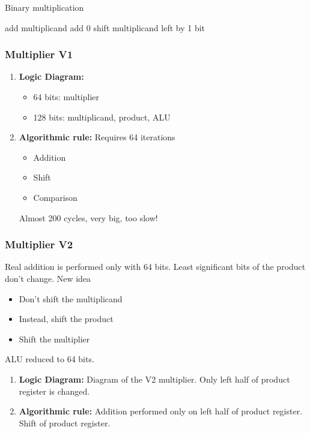 \begin{algorithm}[H]
    \caption{Binary multiplication}
    \begin{algorithmic}
            \State add multiplicand
        \Else
            \State add 0
        \EndIf
        \State shift multiplicand left by 1 bit
    \end{algorithmic}
\end{algorithm}

\subsubsection{Multiplier V1}
\begin{enumerate}
    \item \textbf{Logic Diagram:}
    \begin{itemize}
        \item 64 bits: multiplier
        \item 128 bits: multiplicand, product, ALU
    \end{itemize}
    \item \textbf{Algorithmic rule:} Requires 64 iterations
    \begin{itemize}
        \item Addition
        \item Shift
        \item Comparison
    \end{itemize}
    Almost 200 cycles, very big, too slow!
\end{enumerate}

\subsubsection{Multiplier V2}
Real addition is performed only with 64 bits. Least significant bits of the product don't change. New idea
\begin{itemize}
    \item Don’t shift the multiplicand
    \item Instead, shift the product
    \item Shift the multiplier
\end{itemize}
ALU reduced to 64 bits. 

\begin{enumerate}
    \item \textbf{Logic Diagram:} Diagram of the V2 multiplier. Only left half of product register is changed. 
    \item \textbf{Algorithmic rule:} Addition performed only on left half of product register. Shift of product register. 
\end{enumerate}

